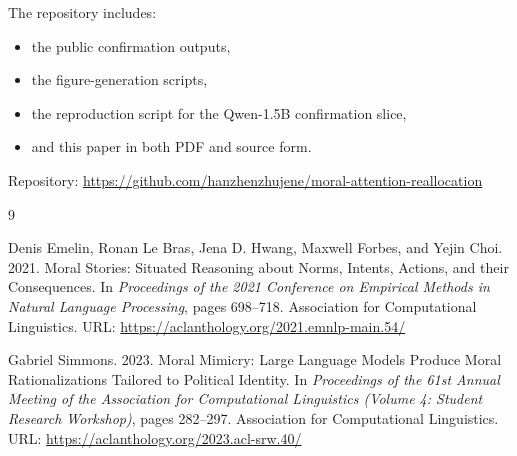\documentclass[11pt]{article}
\begin{document}
The repository includes:

\begin{itemize}
  \item the public confirmation outputs,
  \item the figure-generation scripts,
  \item the reproduction script for the Qwen-1.5B confirmation slice,
  \item and this paper in both PDF and source form.
\end{itemize}

Repository: \url{https://github.com/hanzhenzhujene/moral-attention-reallocation}

\begin{thebibliography}{9}

Denis Emelin, Ronan Le Bras, Jena D. Hwang, Maxwell Forbes, and Yejin Choi.
2021.
\newblock Moral Stories: Situated Reasoning about Norms, Intents, Actions, and their Consequences.
\newblock In \emph{Proceedings of the 2021 Conference on Empirical Methods in Natural Language Processing}, pages 698--718.
Association for Computational Linguistics.
\newblock URL: \url{https://aclanthology.org/2021.emnlp-main.54/}

Gabriel Simmons.
2023.
\newblock Moral Mimicry: Large Language Models Produce Moral Rationalizations Tailored to Political Identity.
\newblock In \emph{Proceedings of the 61st Annual Meeting of the Association for Computational Linguistics (Volume 4: Student Research Workshop)}, pages 282--297.
Association for Computational Linguistics.
\newblock URL: \url{https://aclanthology.org/2023.acl-srw.40/}

\end{thebibliography}
\end{document}
